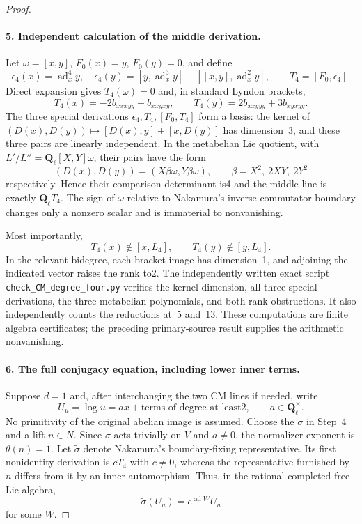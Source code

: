 \begin{proof}
\paragraph{5. Independent calculation of the middle derivation.}
Let $\omega=[x,y]$, $F_0(x)=y$, $F_0(y)=0$, and define
\[
 \epsilon_4(x)=\operatorname{ad}_x^4y,\quad
 \epsilon_4(y)=[y,\operatorname{ad}_x^3y]-[[x,y],\operatorname{ad}_x^2y],
 \qquad T_4=[F_0,\epsilon_4].
\]
Direct expansion gives $T_4(\omega)=0$ and, in standard Lyndon brackets,
\[
 T_4(x)=-2b_{xxxyy}-b_{xxyxy},\qquad
 T_4(y)=2b_{xxyyy}+3b_{xyxyy}.
\]
The three special derivations $\epsilon_4,T_4,[F_0,T_4]$ form a basis: the kernel of $(D(x),D(y))\mapsto[D(x),y]+[x,D(y)]$ has dimension~3, and these three pairs are linearly independent. In the metabelian Lie quotient, with $L'/L''=\mathbf Q_\ell[X,Y]\omega$, their pairs have the form
\[
 (D(x),D(y))=(X\beta\omega,Y\beta\omega),\qquad
 \beta=X^2,\ 2XY,\ 2Y^2
\]
respectively. Hence their comparison determinant is4 and the middle line is exactly $\mathbf Q_\ell T_4$. The sign of $\omega$ relative to Nakamura's inverse-commutator boundary changes only a nonzero scalar and is immaterial to nonvanishing.

Most importantly,
\[
 T_4(x)\notin[x,L_4],\qquad T_4(y)\notin[y,L_4].
\]
In the relevant bidegree, each bracket image has dimension~1, and adjoining the indicated vector raises the rank to2. The independently written exact script \texttt{check\_CM\_degree\_four.py} verifies the kernel dimension, all three special derivations, the three metabelian polynomials, and both rank obstructions. It also independently counts the reductions at~5 and~13. These computations are finite algebra certificates; the preceding primary-source result supplies the arithmetic nonvanishing.

\paragraph{6. The full conjugacy equation, including lower inner terms.}
Suppose $d=1$ and, after interchanging the two CM lines if needed, write
\[
 U_u=\log u=a x+\text{terms of degree at least2},\qquad a\in\mathbf Q_\ell^\times.
\]
No primitivity of the original abelian image is assumed. Choose the $\sigma$ in Step~4 and a lift $n\in N$. Since $\sigma$ acts trivially on $V$ and $a\ne0$, the normalizer exponent is $\theta(n)=1$. Let $\widetilde\sigma$ denote Nakamura's boundary-fixing representative. Its first nonidentity derivation is $cT_4$ with $c\ne0$, whereas the representative furnished by $n$ differs from it by an inner automorphism. Thus, in the rational completed free Lie algebra,
\[
 \widetilde\sigma(U_u)=e^{\operatorname{ad} W}U_u
\]
for some $W$.


\end{proof}
